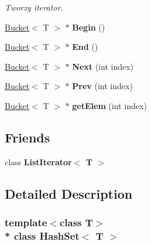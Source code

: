 \begin{DoxyCompactItemize}
\begin{DoxyCompactList}\small\item\em Tworzy iterator. \end{DoxyCompactList}\item 
\hyperlink{struct_bucket}{Bucket}$<$ T $>$ $\ast$ {\bfseries Begin} ()\hypertarget{class_hash_set_ac43e4a912377a0b096df5fe280bd7218}{}\label{class_hash_set_ac43e4a912377a0b096df5fe280bd7218}

\item 
\hyperlink{struct_bucket}{Bucket}$<$ T $>$ $\ast$ {\bfseries End} ()\hypertarget{class_hash_set_a8a8f4191310a7f28c1c5fc356312a539}{}\label{class_hash_set_a8a8f4191310a7f28c1c5fc356312a539}

\item 
\hyperlink{struct_bucket}{Bucket}$<$ T $>$ $\ast$ {\bfseries Next} (int index)\hypertarget{class_hash_set_a16ebca3919161590ffb2e8200296f67b}{}\label{class_hash_set_a16ebca3919161590ffb2e8200296f67b}

\item 
\hyperlink{struct_bucket}{Bucket}$<$ T $>$ $\ast$ {\bfseries Prev} (int index)\hypertarget{class_hash_set_a0838720def3395d1d8049ad3d804fb85}{}\label{class_hash_set_a0838720def3395d1d8049ad3d804fb85}

\item 
\hyperlink{struct_bucket}{Bucket}$<$ T $>$ $\ast$ {\bfseries get\+Elem} (int index)\hypertarget{class_hash_set_a722951407ebd96fbc0d70e0a5601de70}{}\label{class_hash_set_a722951407ebd96fbc0d70e0a5601de70}

\end{DoxyCompactItemize}
\subsection*{Friends}
\begin{DoxyCompactItemize}
\item 
class {\bfseries List\+Iterator$<$ T $>$}\hypertarget{class_hash_set_aa8b5ec32a370e05b6873477d1ef083e6}{}\label{class_hash_set_aa8b5ec32a370e05b6873477d1ef083e6}

\end{DoxyCompactItemize}


\subsection{Detailed Description}
\subsubsection*{template$<$class T$>$\\*
class Hash\+Set$<$ T $>$}

